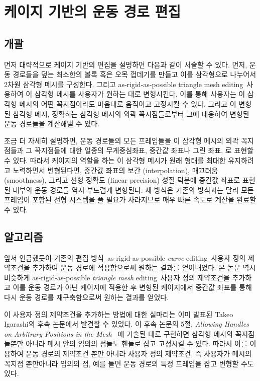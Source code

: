 \documentclass[11pt,a4paper,oneside,draft]{report}
\newcommand{\Kim}{\cite{Kim:2009:SMM:1531326.1531385}}
\newcommand{\Igarashi}{\cite{Igarashi:2005:ASM:1073204.1073323}}
\begin{document}
\chapter{케이지 기반의 운동 경로 편집}
\section{개괄}
먼저 대략적으로 케이지 기반의 편집을 설명하면 다음과 같이 서술할 수 있다.
먼저, 운동 경로들을 덮는 최소한의 볼록 혹은 오목 껍데기를 만들고 이를
삼각형으로 나누어서 2차원 삼각형 메시를 구성한다. 그리고 as-rigid-as-possible
triangle mesh editing~ 사용하여 이 삼각형 메시를 사용자가 원하는
대로 변형시킨다.  이를 통해 사용자는 이 삼각형 메시의 어떤 꼭지점이라도
마음대로 움직이고 고정시킬 수 있다. 그리고 이 변형된 삼각형 메시, 정확히는
삼각형 메시의 외곽 꼭지점들로부터 그에 대응하여 변형된 운동 경로들을 계산해낼
수 있다.

조금 더 자세히 설명하면, 운동 경로들의 모든 프레임들을 이 삼각형 메시의 외곽
꼭지점들과 그 꼭지점들에 대한 일종의 무게중심좌표, 중간값 좌표나 그린 좌표, 로
표현할 수 있다. 따라서 케이지의 역할을 하는 이 삼각형 메시가 원래 형태를 최대한
유지하려고 노력하면서 변형된다면, 중간값 좌표의 보간 (interpolation), 매끄러움
(smoothness), 그리고 선형 정확도 (linear precision) 성질 덕분에 중간값 좌표로
표현된 내부의 운동 경로들 역시 부드럽게 변형된다. 새 방식은 기존의 방식과는
달리 모든 프레임이 포함된 선형 시스템을 풀 필요가 사라지므로 매우 빠른 속도로
계산을 완료할 수 있다.

\section{알고리즘}
앞서 언급했듯이 기존의 편집 방식~ as-rigid-as-possible \emph{curve}
editing~ 사용자 정의 제약조건을 추가하여 운동 경로에 적용함으로써
원하는 결과를 얻어내었다.  본 논문 역시 비슷하게 as-rigid-as-possible
\emph{triangle mesh} editing~ 사용자 정의 제약조건을 추가하고 이를
운동 경로가 아닌 케이지에 적용한 후 변형된 케이지에서 중간값 좌표를 통해 다시
운동 경로를 재구축함으로써 원하는 결과를 얻었다.

이 사용자 정의 제약조건을 추가하는 방법에 대한 실마리는 이미 발표된 Takeo
Igarashi의 후속 논문에서 발견할 수 있었다. 이 후속 논문의 5절, \emph{Allowing
Handles on Arbitrary Positions in the
Mesh}~\cite[p.26]{doi:10.1080/2151237X.2009.10129273} 에 기술된 대로 구현하면
삼각형 메시의 꼭지점들뿐만 아니라 메시 안의 임의의 점들도 핸들로 잡고 고정시킬
수 있다.  따라서 이를 이용하여 운동 경로의 제약조건 뿐만 아니라 사용자 정의
제약조건, 즉 사용자가 메시의 꼭지점 뿐만아니라 임의의 점, 예를 들면 운동 경로의
특정 프레임을 잡고 변형할 수도 있다.
\end{document}
